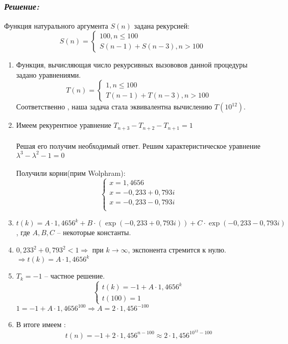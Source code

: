 \documentclass[a4paper, 11pt]{article} %
\newcommand*\circled[1]{\tikz[baseline=(char.base)]{
            \node[shape=circle,draw,inner sep=2pt] (char) {#1};}}
\begin{document}
\subsection*{\circled{4}} 	
\subsubsection*{\textit{Решение:}}

Функция натурального аргумента $S(n)$ задана рекурсией:
	\[S(n) = \begin{cases}
		100, n\le100\\
		S(n-1) + S(n-3), n>100
   \end{cases}
    \]
   \begin{enumerate}
   	\item Функция, вычисляющая число рекурсивных вызововов данной процедуры задано уравнениями.
   		\[T(n) = \begin{cases}
   	1, n\le100\\
   	T(n-1) + T(n-3), n>100
   	\end{cases}
   	\]
   	Соответственно , наша задача стала эквивалентна вычислению $T(10^{12})$.
   	\item Имеем рекурентное уравнение $T_{n+3} - T_{n+2} - T_{n+1} = 1$\\\\
   	Решая его получим необходимый ответ.
   	Решим характеристическое уравнение $\lambda^3  - \lambda^2 - 1=0$  
   		\\\\	Получили корни(прим Wolphram):
   				\[\begin{cases}
x = 1,4656 \\
x = -0,233 + 0,793i\\				
x = -0,233 - 0,793i\\
   	\end{cases}
	\]
	\item $t(k) = A\cdot 1,4656^k + B \cdot (\exp(-0,233 + 0,793i)) + C \cdot \exp (-0,233 - 0,793i)$, где $A,B,C$ -- некоторые константы.
	\item $0,233^2 + 0,793^2 < 1 \Rightarrow$ при $k \rightarrow \infty$, экспонента стремится к нулю. $\Rightarrow t(k) = A\cdot 1,4656^k$ \\
	\item $T_k = -1$ -- частное решение.
	   				\[\begin{cases}
t(k) = -1 + A\cdot 1,4656^k\\
t(100) = 1
	\end{cases}\]
	$1 = -1 + A\cdot 1,4656^{100} \Rightarrow A = 2 \cdot 1,456^{-100}$
	\item В итоге имеем :
	\[t(n) = -1 + 2\cdot 1,456^{n-100} \approx 2\cdot 1,456^{10^{12}-100}\]
   \end{enumerate}
\end{document}
